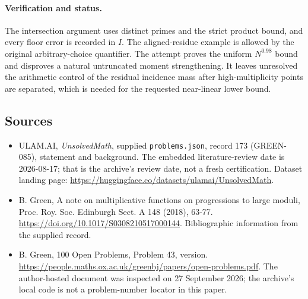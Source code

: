 \documentclass[11pt,a4paper]{article}
\begin{document}
\paragraph{Verification and status.}
The intersection argument uses distinct primes and the strict product bound, and every floor error is recorded in $I$. The aligned-residue example is allowed by the original arbitrary-choice quantifier. The attempt proves the uniform $N^{0.98}$ bound and disproves a natural untruncated moment strengthening. It leaves unresolved the arithmetic control of the residual incidence mass after high-multiplicity points are separated, which is needed for the requested near-linear lower bound.

\subsection{Sources}

{\small

\begin{itemize}

\item[\hypertarget{source:173:1}{S1}] ULAM.AI, \emph{UnsolvedMath}, supplied \texttt{problems.json}, record 173 (GREEN-085), statement and background. The embedded literature-review date is 2026-08-17; that is the archive’s review date, not a fresh certification. Dataset landing page: \url{https://huggingface.co/datasets/ulamai/UnsolvedMath}.

\item[\hypertarget{source:173:2}{S2}] B. Green, A note on multiplicative functions on progressions to large moduli, Proc. Roy. Soc. Edinburgh Sect. A 148 (2018), 63-77. \url{https://doi.org/10.1017/S0308210517000144}. Bibliographic information from the supplied record.

\item[\hypertarget{source:173:3}{S3}] B. Green, 100 Open Problems, Problem 43, version. \url{https://people.maths.ox.ac.uk/greenbj/papers/open-problems.pdf}. The author-hosted document was inspected on 27 September 2026; the archive’s local code is not a problem-number locator in this paper.

\end{itemize}

}

\label{end:173}
\end{document}
